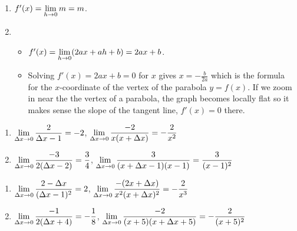 \begin{enumerate}
\setcounter{enumi}{\value{HW}}

\item  $f'(x) = \displaystyle{\lim_{h \rightarrow 0} m= m}$.

\item  \begin{itemize} \item  $f'(x) = \displaystyle{\lim_{h \rightarrow 0} (2ax + ah + b) = 2ax + b}$.

\smallskip

\item  Solving $f'(x) = 2ax + b = 0$ for $x$ gives $x = -\frac{b}{2a}$ which is the formula for the $x$-coordinate of the vertex of the parabola $y = f(x)$.  If we zoom in near the the vertex of a parabola, the graph becomes locally flat so it makes sense the slope of the tangent line,  $f'(x) = 0$ there. 

\end{itemize} 

\setcounter{HW}{\value{enumi}}
\end{enumerate}

\begin{enumerate}
\setcounter{enumi}{\value{HW}}

\item  $\displaystyle{ \lim_{\Delta x \rightarrow 0} \dfrac{2}{\Delta x-1} = -2}$,   $\displaystyle{ \lim_{\Delta x \rightarrow 0} \dfrac{-2}{x(x+\Delta x)} = - \dfrac{2}{x^2}}$
 
\item  $\displaystyle{ \lim_{\Delta x \rightarrow 0} \dfrac{-3}{2(\Delta x - 2)} = \dfrac{3}{4}}$,   $\displaystyle{ \lim_{\Delta x \rightarrow 0} \dfrac{3}{(x+\Delta x-1)(x-1)} =  \dfrac{3}{(x-1)^2}}$  

\setcounter{HW}{\value{enumi}}
\end{enumerate}

\begin{enumerate}
\setcounter{enumi}{\value{HW}}

\item   $\displaystyle{ \lim_{\Delta x \rightarrow 0} \dfrac{2-\Delta x}{(\Delta x - 1)^2} =2}$,   $\displaystyle{ \lim_{\Delta x \rightarrow 0}\dfrac{-(2x+\Delta x)}{x^2(x+\Delta x)^2} =  - \dfrac{2}{x^3}}$   

\item    $\displaystyle{ \lim_{\Delta x \rightarrow 0} \dfrac{-1}{2(\Delta x+4)} = - \dfrac{1}{8}}$,   $\displaystyle{ \lim_{\Delta x \rightarrow 0} \dfrac{-2}{(x+5)(x+\Delta x+5)}=  - \dfrac{2}{(x+5)^2}}$    

\setcounter{HW}{\value{enumi}}
\end{enumerate}

